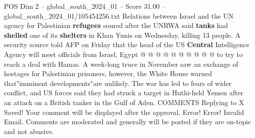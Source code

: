 \begin{textsample}{POS Dim 2 – global\_south\_2024\_01 – Score 31.00 – global\_south\_2024\_01/105454256.txt}
Relations between Israel and the UN agency for Palestinian \textbf{refugees} soured after the UNRWA said \textbf{tanks} had \textbf{shelled} one of its \textbf{shelters} in Khan Yunis on Wednesday, killing 13 people.
A security source told AFP on Friday that the head of the US \textbf{Central} Intelligence Agency will meet officials from Israel, Egypt @ @ @ @ @ @ @ @ @ @ to try to reach a deal with Hamas.
A week-long truce in November saw an exchange of hostages for Palestinian prisoners, however, the White House warned that"imminent developments"are unlikely.
The war has led to fears of wider conflict, and US forces said they had struck a target in Huthi-held Yemen after an attack on a British tanker in the Gulf of Aden.
COMMENTS Replying to X Saved!
Your comment will be displayed after the approval.
Error!
Error!
Invalid Email.
Comments are moderated and generally will be posted if they are on-topic and not abusive.

\end{textsample}
